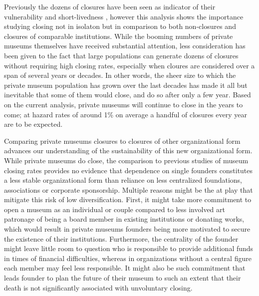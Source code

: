 \documentclass[12pt]{article}
\begin{document}
Previously the dozens of closures have been seen as indicator of their vulnerability and short-livedness \parencite{Adam_2020_close}, however this analysis shows the importance studying closing not in isolaton but in comparison to both non-closures and closures of comparable institutions.
While the booming numbers of private museums themselves have received substantial attention, less consideration has been given to the fact that large populations can generate dozens of closures without requiring high closing rates, especially when cloures are considered over a span of several years or decades.
In other words, the sheer size to which the private museum population has grown over the last decades has made it all but inevitable that some of them would close, and do so after only a few year.
Based on the current analysis, private museums will continue to close in the years to come; at hazard rates of around 1\% on average a handful of closures every year are to be expected.



Comparing private museums closures to closures of other organizational form advances our understanding of the sustainability of this new organizational form.
While private museums do close, the comparison to previous studies of museum closing rates provides no evidence that dependence on single founders constitutes a less stable organizational form than reliance on less centralized foundations, associations or corporate sponsorship.
Multiple reasons might be the at play that mitigate this risk of low diversification.
First, it might take more commitment to open a museum as an individual or couple compared to less involved art patronage of being a board member in existing institutions or donating works, which would result in private museums founders being more motivated to secure the existence of their institutions.
Furthermore, the centrality of the founder might leave little room to question who is responsible to provide additional funds in times of financial difficulties, whereas in organizations without a central figure each member may feel less responsible.
It might also be such commitment that leads founder to plan the future of their museum to such an extent that their death is not significantly associated with unvoluntary closing.
\end{document}
